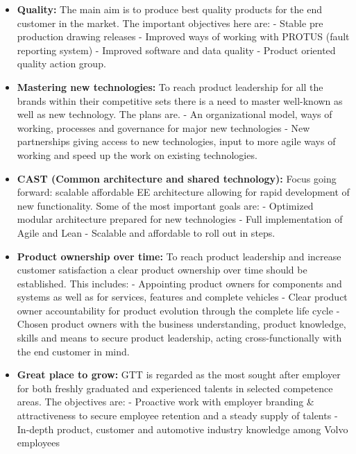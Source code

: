 \begin{itemize}
    
     \item \textbf{Quality:} The main aim is to produce best quality products for the end customer in the market. The important objectives here are:
- Stable pre production drawing releases
- Improved ways of working with PROTUS (fault reporting system)
- Improved software and data quality
- Product oriented quality action group.

     \item \textbf{Mastering new technologies:}
To reach product leadership for all the brands within their competitive sets there is a need to master well-known as well as new technology. The plans are.
- An organizational model, ways of working, processes and governance for major new technologies
- New partnerships giving access to new technologies, input to more agile ways of working and speed up the work on existing technologies.

     \item \textbf{CAST (Common architecture and shared technology):}
Focus going forward: scalable affordable EE architecture allowing for rapid development of new functionality. Some of the most important goals are:
- Optimized modular architecture prepared for new technologies 
- Full implementation of Agile and Lean
- Scalable and affordable to roll out in steps.

     \item \textbf{Product ownership over time:}
To reach product leadership and increase customer satisfaction a clear product ownership over time should be established. This includes:
- Appointing product owners for components and systems as well as for services, features and complete vehicles 
- Clear product owner accountability for product evolution through the complete life cycle
- Chosen product owners with the business understanding, product knowledge, skills and means to secure product leadership, acting cross-functionally with the end customer in mind.

     \item \textbf{Great place to grow:}
GTT is regarded as the most sought after employer for both freshly graduated and experienced talents in selected competence areas. The objectives are:
- Proactive work with employer branding & attractiveness to secure employee retention and a steady supply of talents
- In-depth product, customer and automotive industry knowledge among Volvo employees
\\

\end{itemize}

